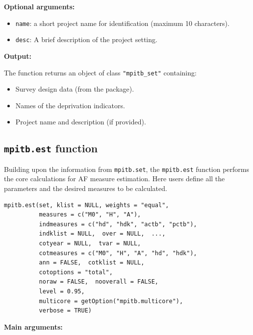 \textbf{Optional arguments:}

\begin{itemize}
\item
  \texttt{name}: a short project name for identification (maximum 10 characters).
\item
  \texttt{desc}: A brief description of the project setting.
\end{itemize}

\textbf{Output:}

The function returns an object of class \texttt{"mpitb\_set"} containing:

\begin{itemize}
\item
  Survey design data (from the  package).
\item
  Names of the deprivation indicators.
\item
  Project name and description (if provided).
\end{itemize}

\subsection{\texorpdfstring{\texttt{mpitb.est} function}{mpitb.est function}}\label{mpitb.est-function}

Building upon the information from \texttt{mpitb.set}, the \texttt{mpitb.est} function performs the core calculations for AF measure estimation. Here users define all the parameters and the desired measures to be calculated.

\begin{verbatim}
mpitb.est(set, klist = NULL, weights = "equal",
          measures = c("M0", "H", "A"), 
          indmeasures = c("hd", "hdk", "actb", "pctb"),
          indklist = NULL,  over = NULL,  ...,  
          cotyear = NULL,  tvar = NULL,  
          cotmeasures = c("M0", "H", "A", "hd", "hdk"), 
          ann = FALSE,  cotklist = NULL,  
          cotoptions = "total", 
          noraw = FALSE,  nooverall = FALSE, 
          level = 0.95,  
          multicore = getOption("mpitb.multicore"),
          verbose = TRUE)
\end{verbatim}

\textbf{Main arguments:}

